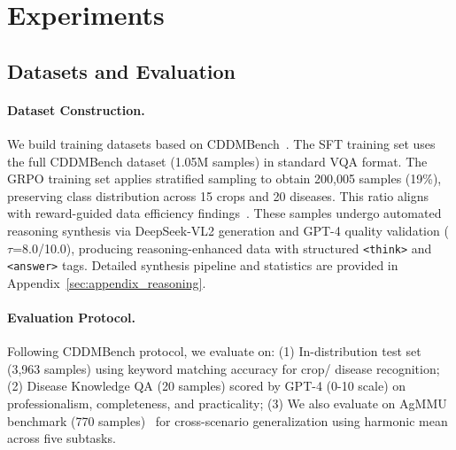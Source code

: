 \documentclass[11pt]{article}
\begin{document}





\section{Experiments}
\label{sec:experiments}

\subsection{Datasets and Evaluation}

\paragraph{Dataset Construction.}
We build training datasets based on CDDMBench~\cite{liu2024multimodal}. The SFT training set uses the full CDDMBench dataset (1.05M samples) in standard VQA format. The GRPO training set applies stratified sampling to obtain 200,005 samples (19\%), preserving class distribution across 15 crops and 20 diseases. This ratio aligns with reward-guided data efficiency findings~\cite{zhi2025medgr}. These samples undergo automated reasoning synthesis via DeepSeek-VL2 generation and GPT-4 quality validation ($\tau$=8.0/10.0), producing reasoning-enhanced data with structured \texttt{<think>} and \texttt{<answer>} tags. Detailed synthesis pipeline and statistics are provided in Appendix~\ref{sec:appendix_reasoning}.


\paragraph{Evaluation Protocol.}
Following CDDMBench protocol, we evaluate on: (1) In-distribution test set (3,963 samples) using keyword matching accuracy for crop/ disease recognition; (2) Disease Knowledge QA (20 samples) scored by GPT-4 (0-10 scale) on professionalism, completeness, and practicality; (3) We also evaluate on AgMMU benchmark (770 samples)~\cite{gauba2025agmmu} for cross-scenario generalization using harmonic mean across five subtasks.
\end{document}
